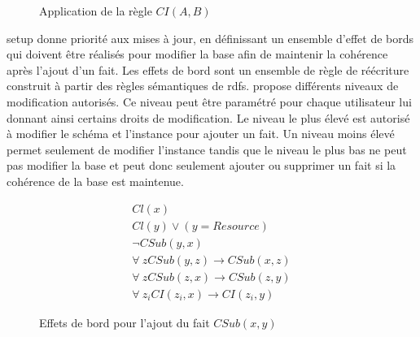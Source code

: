 \begin{figure}[ht]
    \centering
    \begin{subfigure}[b]{.45\textwidth}
        \centering
    \end{subfigure}
    \raisebox{1.5cm}{\scalebox{1.5}{$\longrightarrow$}}
    \begin{subfigure}[b]{.45\textwidth}
        \centering
    \end{subfigure}
    \caption{Application de la règle $CI(A,B)$}
    \label{fig:rule_ci}
\end{figure}

\gls{setup} donne priorité aux mises à jour, en définissant un ensemble d'effet de bords qui doivent être réalisés pour modifier la base afin de maintenir la cohérence après l'ajout d'un fait.
Les effets de bord sont un ensemble de règle de réécriture construit à partir des règles sémantiques de \gls{rdfs}.
\cite{chabinUsingGraphGrammar2019} propose différents niveaux de modification autorisés.
Ce niveau peut être paramétré pour chaque utilisateur lui donnant ainsi certains droits de modification.
Le niveau le plus élevé est autorisé à modifier le schéma et l'instance pour ajouter un fait.
Un niveau moins élevé permet seulement de modifier l'instance tandis que le niveau le plus bas ne peut pas modifier la base et peut donc seulement ajouter ou supprimer un fait si la cohérence de la base est maintenue.

\begin{figure}[ht]
    \begin{align}
        Cl(x)\\
        Cl(y) \lor (y = Resource)\\
        \neg CSub(y, x)\\
        \forall~z CSub(y, z) \to CSub(x, z)\\
        \forall~z CSub(z, x) \to CSub(z, y)\\
        \forall~z_i CI(z_i, x) \to CI(z_i, y) \label{eq:rule_csub:ci}
    \end{align}
    \caption{Effets de bord pour l'ajout du fait $CSub(x, y)$}
    \label{eq:rule_csub}
\end{figure}

